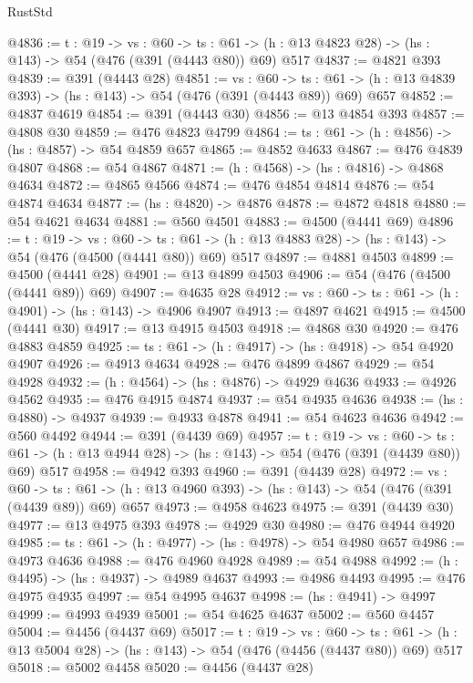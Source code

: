 \begin{lexlean}{RustStd}
\begin{coremodule}
@4836 := {t : @19} ->
  {vs : @60} ->
  {ts : @61} -> (h : @13 @4823 @28) -> (hs : @143) -> @54 (@476 (@391 (@4443 @80)) @69) @517
@4837 := @4821 @393
@4839 := @391 (@4443 @28)
@4851 := {vs : @60} ->
  {ts : @61} -> (h : @13 @4839 @393) -> (hs : @143) -> @54 (@476 (@391 (@4443 @89)) @69) @657
@4852 := @4837 @4619
@4854 := @391 (@4443 @30)
@4856 := @13 @4854 @393
@4857 := @4808 @30
@4859 := @476 @4823 @4799
@4864 := {ts : @61} -> (h : @4856) -> (hs : @4857) -> @54 @4859 @657
@4865 := @4852 @4633
@4867 := @476 @4839 @4807
@4868 := @54 @4867
@4871 := (h : @4568) -> (hs : @4816) -> @4868 @4634
@4872 := @4865 @4566
@4874 := @476 @4854 @4814
@4876 := @54 @4874 @4634
@4877 := (hs : @4820) -> @4876
@4878 := @4872 @4818
@4880 := @54 @4621 @4634
@4881 := @560 @4501
@4883 := @4500 (@4441 @69)
@4896 := {t : @19} ->
  {vs : @60} ->
  {ts : @61} -> (h : @13 @4883 @28) -> (hs : @143) -> @54 (@476 (@4500 (@4441 @80)) @69) @517
@4897 := @4881 @4503
@4899 := @4500 (@4441 @28)
@4901 := @13 @4899 @4503
@4906 := @54 (@476 (@4500 (@4441 @89)) @69)
@4907 := @4635 @28
@4912 := {vs : @60} -> {ts : @61} -> (h : @4901) -> (hs : @143) -> @4906 @4907
@4913 := @4897 @4621
@4915 := @4500 (@4441 @30)
@4917 := @13 @4915 @4503
@4918 := @4868 @30
@4920 := @476 @4883 @4859
@4925 := {ts : @61} -> (h : @4917) -> (hs : @4918) -> @54 @4920 @4907
@4926 := @4913 @4634
@4928 := @476 @4899 @4867
@4929 := @54 @4928
@4932 := (h : @4564) -> (hs : @4876) -> @4929 @4636
@4933 := @4926 @4562
@4935 := @476 @4915 @4874
@4937 := @54 @4935 @4636
@4938 := (hs : @4880) -> @4937
@4939 := @4933 @4878
@4941 := @54 @4623 @4636
@4942 := @560 @4492
@4944 := @391 (@4439 @69)
@4957 := {t : @19} ->
  {vs : @60} ->
  {ts : @61} -> (h : @13 @4944 @28) -> (hs : @143) -> @54 (@476 (@391 (@4439 @80)) @69) @517
@4958 := @4942 @393
@4960 := @391 (@4439 @28)
@4972 := {vs : @60} ->
  {ts : @61} -> (h : @13 @4960 @393) -> (hs : @143) -> @54 (@476 (@391 (@4439 @89)) @69) @657
@4973 := @4958 @4623
@4975 := @391 (@4439 @30)
@4977 := @13 @4975 @393
@4978 := @4929 @30
@4980 := @476 @4944 @4920
@4985 := {ts : @61} -> (h : @4977) -> (hs : @4978) -> @54 @4980 @657
@4986 := @4973 @4636
@4988 := @476 @4960 @4928
@4989 := @54 @4988
@4992 := (h : @4495) -> (hs : @4937) -> @4989 @4637
@4993 := @4986 @4493
@4995 := @476 @4975 @4935
@4997 := @54 @4995 @4637
@4998 := (hs : @4941) -> @4997
@4999 := @4993 @4939
@5001 := @54 @4625 @4637
@5002 := @560 @4457
@5004 := @4456 (@4437 @69)
@5017 := {t : @19} ->
  {vs : @60} ->
  {ts : @61} -> (h : @13 @5004 @28) -> (hs : @143) -> @54 (@476 (@4456 (@4437 @80)) @69) @517
@5018 := @5002 @4458
@5020 := @4456 (@4437 @28)

\end{coremodule}
\end{lexlean}
